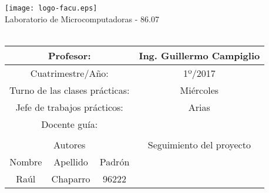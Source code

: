 

\begin{titlepage}
\begin{center}
	\texttt{[image: logo-facu.eps]}\\
\large{Laboratorio de Microcomputadoras - 86.07}
\vspace{0.2cm}\\
\huge{\mySubtitle}\\
\vspace{7mm}
\normalsize
\begin{tabular}{|c|c|c|c|c|c|c|c|c|c|c|c|}
\hline
\multicolumn{3}{|c|}{Profesor:}  & \multicolumn{9}{|c|}{Ing. Guillermo Campiglio}\\
\hline
\multicolumn{3}{|c|}{Cuatrimestre/Año:}  & \multicolumn{9}{|c|}{1º/2017}\\
\hline
\multicolumn{3}{|c|}{Turno de las clases prácticas:}  & \multicolumn{9}{|c|}{Miércoles}\\
\hline
\multicolumn{3}{|c|}{Jefe de trabajos prácticos:}  & \multicolumn{9}{|c|}{Arias}\\
\hline
\multicolumn{3}{|c|}{Docente guía:}  & \multicolumn{9}{|c|}{}\\
\hline
\multicolumn{12}{|c|}{}\\
\hline
\multicolumn{3}{|c|}{Autores}  & \multicolumn{9}{|c|}{Seguimiento del proyecto}\\
\hline
Nombre & Apellido & Padrón & \hspace{4mm} & \hspace{4mm} & \hspace{4mm} & \hspace{4mm} &\hspace{4mm} &\hspace{4mm} &\hspace{4mm} &\hspace{4mm} &\hspace{4mm} \\
\hline
Raúl & Chaparro  & 96222& \hspace{4mm} & \hspace{4mm} & \hspace{4mm} & \hspace{4mm} &\hspace{4mm} &\hspace{4mm} &\hspace{4mm} &\hspace{4mm} &\hspace{4mm} \\

\end{tabular}
\end{center}
\end{titlepage}
